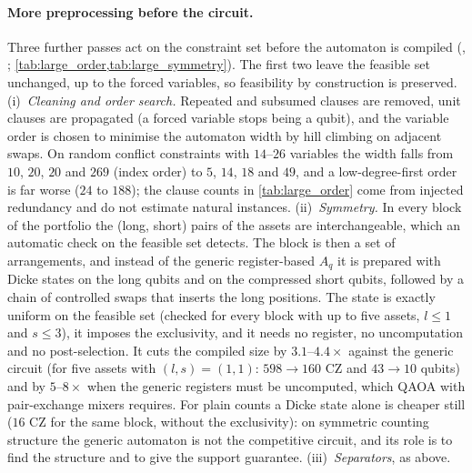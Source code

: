 \paragraph{More preprocessing before the circuit.} Three further passes act on the constraint set before the automaton is compiled (, ; \cref{tab:large_order,tab:large_symmetry}). The first two leave the feasible set unchanged, up to the forced variables, so feasibility by construction is preserved. (i)~\emph{Cleaning and order search.} Repeated and subsumed clauses are removed, unit clauses are propagated (a forced variable stops being a qubit), and the variable order is chosen to minimise the automaton width by hill climbing on adjacent swaps. On random conflict constraints with $14$--$26$ variables the width falls from $10$, $20$, $20$ and $269$ (index order) to $5$, $14$, $18$ and $49$, and a low-degree-first order is far worse ($24$ to $188$); the clause counts in \cref{tab:large_order} come from injected redundancy and do not estimate natural instances. (ii)~\emph{Symmetry.} In every block of the portfolio the (long, short) pairs of the assets are interchangeable, which an automatic check on the feasible set detects. The block is then a set of arrangements, and instead of the generic register-based $A_q$ it is prepared with Dicke states on the long qubits and on the compressed short qubits, followed by a chain of controlled swaps that inserts the long positions. The state is exactly uniform on the feasible set (checked for every block with up to five assets, $l\le1$ and $s\le3$), it imposes the exclusivity, and it needs no register, no uncomputation and no post-selection. It cuts the compiled size by $3.1$--$4.4\times$ against the generic circuit (for five assets with $(l,s)=(1,1)$: $598\to160$ CZ and $43\to10$ qubits) and by $5$--$8\times$ when the generic registers must be uncomputed, which QAOA with pair-exchange mixers requires. For plain counts a Dicke state alone is cheaper still ($16$ CZ for the same block, without the exclusivity): on symmetric counting structure the generic automaton is not the competitive circuit, and its role is to find the structure and to give the support guarantee. (iii)~\emph{Separators}, as above.




